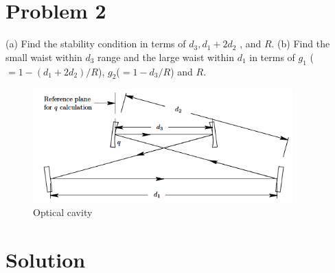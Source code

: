 \documentclass{article}
\begin{document}
\section{Problem 2}
(a) Find the stability condition in terms of $d_3 , d_1+2d_2$ , and $R$.
(b) Find the small waist within $d_3$ range and the large waist within $d_1$ in terms of $g_1$ ($=1-(d_1+2d_2 )/R$), $g_2$($=1-d_3/R$) and $R$.

\begin{figure}[ht]
	\centering
	\includegraphics[width=10cm]{f2.png}
	\caption{Optical cavity}
\end{figure}

\section*{Solution}
\end{document}
